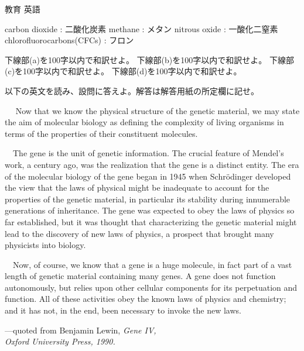 \documentclass[fleqn]{jbook}
\begin{document}
\begin{question}{教育 英語}{}
\begin{subquestions}
  carbon dioxide : 二酸化炭素 \quad
  methane : メタン \quad
  nitrous oxide : 一酸化二窒素 \\
  chlorofluorocarbons(CFCs) : フロン
\baselineskip=15pt

  \noindent{[設問]}
  \begin{subsubquestions}
  \SubSubQuestion
    下線部(a)を100字以内で和訳せよ。
  \SubSubQuestion
    下線部(b)を100字以内で和訳せよ。
  \SubSubQuestion
    下線部(c)を100字以内で和訳せよ。
  \SubSubQuestion
    下線部(d)を100字以内で和訳せよ。
  \end{subsubquestions}





\SubQuestion
  以下の英文を読み、設問に答えよ。解答は解答用紙の所定欄に記せ。
\baselineskip=12pt

  Now that we know the physical structure of the genetic material,
  we may state the aim of molecular biology as defining the complexity
  of living organisms in terms of the properties of their constituent
  molecules.

  　The gene is the unit of genetic information. The crucial feature
  of Mendel's work, a century ago, was the realization that the gene
  is a distinct entity. The era of the molecular biology of the gene
  began in 1945 when Schr\"{o}dinger developed the view that the laws
  of physical might be inadequate to account for the properties of the
  genetic material, in particular its stability during innumerable
  generations of inheritance. The gene was expected to obey the laws
  of physics so far established, but it was thought that
  characterizing the genetic material might lead to the discovery of
  new laws of physics, a prospect that brought many physicists into
  biology.

  　Now, of course, we know that a gene is a huge molecule, in fact
  part of a vast length of genetic material containing many genes.
  A gene does not function autonomously, but relies upon other cellular
  components for its perpetuation and function. All of these
  activities obey the known laws of physics and chemistry; and it has
  not, in the end, been necessary to invoke the new laws.
%
  \begin{flushright}
    ---quoted from Benjamin Lewin, \em Gene IV,\\
    \em Oxford University Press, 1990.
  \end{flushright}


\end{subquestions}
\end{question}
\end{document}
